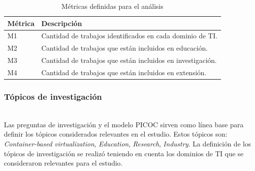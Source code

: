 \begin{table}[htbp]
\centering
\renewcommand{\arraystretch}{1.3}
\begin{tabularx}{\columnwidth}{>{\centering\arraybackslash}m{} >{\RaggedRight\arraybackslash}X}
\toprule
\textbf{Métrica} & \textbf{Descripción} \\
\midrule
M1 & Cantidad de trabajos identificados en cada dominio de TI. \\
M2 & Cantidad de trabajos que están incluidos en educación. \\
M3 & Cantidad de trabajos que están incluidos en investigación. \\
M4 & Cantidad de trabajos que están incluidos en extensión. \\
\bottomrule
\end{tabularx}
\caption{Métricas definidas para el análisis}\label{tab:metricas}
\end{table}
\subsubsection{Tópicos de investigación}
\mbox{}\\
Las preguntas de investigación y el modelo PICOC sirven como línea base para definir los tópicos considerados relevantes en el estudio. Estos tópicos son: \textit{Container-based virtualization}, \textit{Education}, \textit{Research}, \textit{Industry}. 
La definición de los tópicos de investigación se realizó teniendo en cuenta los dominios de TI que se consideraron relevantes para el estudio.\\

